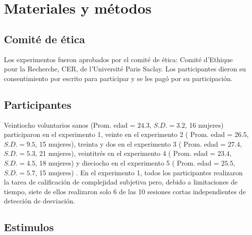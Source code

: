 \section{Materiales y métodos}

\subsection{Comité de ética}
Los experimentos fueron aprobados por el comité de ética: Comité d’Ethique pour la Recherche, CER, de l’Université Paris Saclay. Los participantes dieron su consentimiento por escrito para participar y se les pagó por su participación.

\subsection{Participantes}


Veintiocho voluntarios sanos (Prom. edad = $24.3$, $S.D. = 3.2$, 16 mujeres) participaron en el experimento 1, veinte en el experimento 2 ( Prom. edad = $26.5$, $S.D. = 9.5$, 15 mujeres), treinta y dos en el experimento 3 ( Prom. edad = $27.4$, $S.D. = 5.3$, 21 mujeres), veintitrés en el experimento 4 ( Prom. edad = $23.4$, $S.D. = 4.5$, 18 mujeres) y dieciocho en el experimento 5 ( Prom. edad = $25.5$, $S.D. = 5.7$, 15 mujeres) . En el experimento 1, todos los participantes realizaron la tarea de calificación de complejidad subjetiva pero, debido a limitaciones de tiempo, siete de ellos realizaron solo 6 de las 10 sesiones cortas independientes de detección de desviación.

\subsection{Estimulos}

